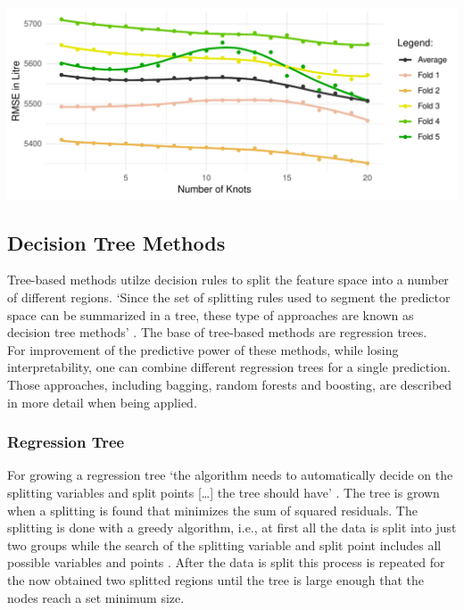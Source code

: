 \documentclass[11pt,]{article}
\let\origfigure\figure
\let\endorigfigure\endfigure
\renewenvironment{figure}[1][2] {
    \expandafter\origfigure\expandafter[H]
} {
    \endorigfigure
}
\begin{document}
\begin{figure}

\includegraphics{../00_data/output_paper/08_splines} \hfill{}

\caption[RMSE Values of Different Spline Models]{\label{fig:splines}Regression with Splines: Dependency Between Knots and RMSE.}\label{fig:splines}
\end{figure}

\hypertarget{decision-tree-methods}{%
\subsection{Decision Tree Methods}\label{decision-tree-methods}}

Tree-based methods utilze decision rules to split the feature space into
a number of different regions. `Since the set of splitting rules used to
segment the predictor space can be summarized in a tree, these type of
approaches are known as decision tree methods'
\autocite[][p. 303]{Hastie2013}. The base of tree-based methods are
regression trees.\\
For improvement of the predictive power of these methods, while losing
interpretability, one can combine different regression trees for a
single prediction. Those approaches, including bagging, random forests
and boosting, are described in more detail when being applied.

\hypertarget{regression-tree}{%
\subsubsection{Regression Tree}\label{regression-tree}}

For growing a regression tree `the algorithm needs to automatically
decide on the splitting variables and split points {[}\ldots{}{]} the
tree should have' \autocite[][p. 349]{Hastie2013}. The tree is grown
when a splitting is found that minimizes the sum of squared residuals.
The splitting is done with a greedy algorithm, i.e., at first all the
data is split into just two groups while the search of the splitting
variable and split point includes all possible variables and points
\autocite[cf.][p. 349]{Hastie2013}. After the data is split this process
is repeated for the now obtained two splitted regions until the tree is
large enough that the nodes reach a set minimum size.
\end{document}
